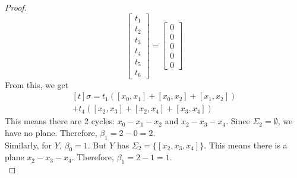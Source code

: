 \begin{proof}
\begin{equation*}
\begin{bmatrix}
				t_1 \\
				t_2 \\
				t_3 \\
				t_4 \\
				t_5 \\
				t_6
			\end{bmatrix} = 
			\begin{bmatrix} 
				0 \\
				0 \\
				0 \\
				0 \\
				0
			\end{bmatrix}
		\end{equation*}
		From this, we get
		\begin{equation*}
			\begin{multlined}[t]
				\sigma = t_1([x_0, x_1] + [x_0,x_2] + [x_1,x_2])\\
				+ t_4([x_2,x_3] + [x_2,x_4] + [x_3,x_4])
			\end{multlined}
		\end{equation*}
		This means there are 2 cycles: $x_0-x_1-x_2$ and $x_2-x_3-x_4$. Since $\Sigma_2=\emptyset$, we have no plane. Therefore, $\beta_1 = 2 - 0 = 2$.\\
		Similarly, for $Y$, $\beta_0 = 1$. But $Y$ has $\Sigma_2=\{[x_2,x_3,x_4]\}$. This means there is a plane $x_2-x_3-x_4$. Therefore, $\beta_1 = 2 - 1 = 1$.\\
	\end{proof}